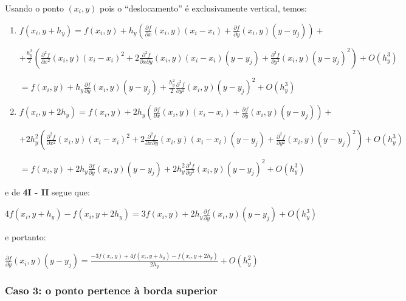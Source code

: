 \documentclass[11pt]{article}
\begin{document}
  \indent\indent Usando o ponto $(x_i, y)$ pois o ``deslocamento'' é exclusivamente vertical, temos:

  \begin{enumerate}[label=\textbf{\Roman*)}]
    \item $f(x_i, y + h_y) = f(x_i, y) + h_y\left(\frac{\partial f}{\partial x}\left(x_i, y \right)\left(x_i - x_i \right) + \frac{\partial f}{\partial y}\left(x_i, y \right)\left(y - y_j \right) \right) +$

    $+ \frac{h_y^2}{2}\left(\frac{\partial^2 f}{\partial x^2}\left(x_i, y\right)\left(x_i - x_i\right)^2 + 2\frac{\partial^2 f}{\partial x \partial y}\left(x_i, y \right)\left(x_i - x_i\right)\left(y - y_j\right) +
    \frac{\partial^2 f}{\partial y^2}\left(x_i, y\right)\left(y - y_j\right)^2 \right) + O(h_y^3)$

    $= f(x_i, y) + h_y\frac{\partial f}{\partial y}\left(x_i, y \right)\left(y - y_j \right) + \frac{h_y^2}{2}\frac{\partial^2 f}{\partial y^2}\left(x_i, y\right)\left(y - y_j\right)^2 + O(h_y^3)$


    \item $f(x_i, y + 2h_y) = f(x_i, y) + 2h_y\left(\frac{\partial f}{\partial x}\left(x_i, y \right)\left(x_i - x_i \right) + \frac{\partial f}{\partial y}\left(x_i, y \right)\left(y - y_j \right) \right) +$

    $+ 2h_y^2\left(\frac{\partial^2 f}{\partial x^2}\left(x_i, y\right)\left(x_i - x_i\right)^2 + 2\frac{\partial^2 f}{\partial x \partial y}\left(x_i, y \right)\left(x_i - x_i\right)\left(y - y_j\right) +
    \frac{\partial^2 f}{\partial y^2}\left(x_i, y\right)\left(y - y_j\right)^2 \right) + O(h_y^3)$

    $= f(x_i, y) + 2h_y\frac{\partial f}{\partial y}\left(x_i, y \right)\left(y - y_j \right) + 2h_y^2\frac{\partial^2 f}{\partial y^2}\left(x_i, y\right)\left(y - y_j\right)^2 + O(h_y^3)$
  \end{enumerate}

  e de \textbf{4I - II} segue que:

  $4f(x_i, y + h_y) - f(x_i, y + 2h_y) = 3f(x_i, y) + 2h_y\frac{\partial f}{\partial y}\left(x_i, y \right)\left(y - y_j \right) + O(h_y^3)$

  e portanto:

  $\frac{\partial f}{\partial y}\left(x_i, y \right)\left(y - y_j \right) = \frac{-3f(x_i, y) + 4f(x_i, y + h_y) - f(x_i, y + 2h_y)}{2h_y}  + O(h_y^2)$


  \subsubsection{Caso 3: o ponto pertence à borda superior}
\end{document}
